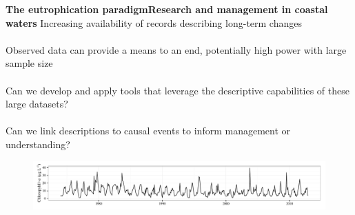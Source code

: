 \documentclass[serif]{beamer}\usepackage[]{graphicx}\usepackage[]{color}
\begin{document}


\begin{frame}{\textbf{The eutrophication paradigm}}{\textbf{Research and management in coastal waters}}
Increasing availability of records describing \alert{long-term changes} \\~\\
Observed data can provide a means to an end, potentially \alert{high power} with large sample size \\~\\
Can we \alert{develop} and \alert{apply} tools that leverage the descriptive capabilities of these large datasets? \\~\\
Can we \alert{link descriptions} to \alert{causal events} to inform management or understanding?
\begin{figure}
\centerline{\includegraphics[width = \textwidth]{fig/ts_ex.pdf}}
\end{figure}
\end{frame}

\end{document}
